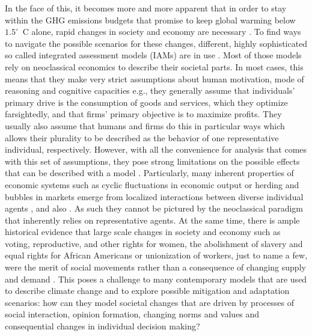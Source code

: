 In the face of this, it becomes more and more apparent that in order to stay within the GHG emissions budgets that promise to keep global warming below $1.5^\circ$~C alone, rapid changes in society and economy are necessary \citep{Rockstrom2017, Geels2017}.
To find ways to navigate the possible scenarios for these changes, different, highly sophisticated so called integrated assessment models (IAMs) are in use \citep{VanVuuren2016}.
Most of those models rely on neoclassical economics to describe their societal parts. In most cases, this means that they make very strict assumptions about human motivation, mode of reasoning and cognitive capacities e.g., they generally assume that individuals' primary drive is the consumption of goods and services, which they optimize farsightedly, and that firms' primary objective is to maximize profits. They usually also assume that humans and firms do this in particular ways which allows their plurality to be described as the behavior of one representative individual, respectively.
However, with all the convenience for analysis that comes with this set of assumptions, they pose strong limitations on the possible effects that can be described with a model \citep{Kirman1992}.
Particularly, many inherent properties of economic systems such as cyclic fluctuations in economic output or herding and bubbles in markets emerge from localized interactions between diverse individual agents \citep{Levin1998, Tesfatsion2003, Anderson2018}, and also \citep[P4]{Asano2019}. As such they cannot be pictured by the neoclassical paradigm that inherently relies on representative agents. 
At the same time, there is ample historical evidence that large scale changes in society and economy such as voting, reproductive, and other rights for women, the abolishment of slavery and equal rights for African Americans or unionization of workers, just to name a few, were the merit of social movements rather than a consequence of changing supply and demand \citep{Tarrow2011, Tilly2019}. 
This poses a challenge to many contemporary models that are used to describe climate change and to explore possible mitigation and adaptation scenarios: how can they model societal changes that are driven by processes of social interaction, opinion formation, changing norms and values and consequential changes in individual decision making?
